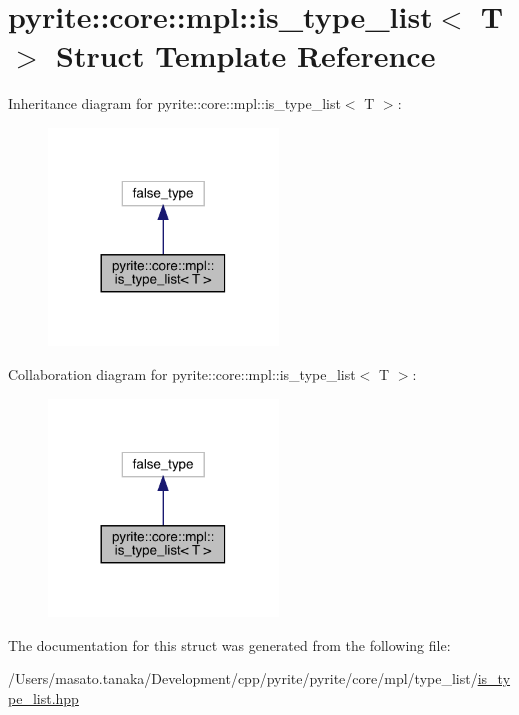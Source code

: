 \hypertarget{structpyrite_1_1core_1_1mpl_1_1is__type__list}{}\section{pyrite\+:\+:core\+:\+:mpl\+:\+:is\+\_\+type\+\_\+list$<$ T $>$ Struct Template Reference}
\label{structpyrite_1_1core_1_1mpl_1_1is__type__list}


Inheritance diagram for pyrite\+:\+:core\+:\+:mpl\+:\+:is\+\_\+type\+\_\+list$<$ T $>$\+:
\nopagebreak
\begin{figure}[H]
\begin{center}
\leavevmode
\includegraphics[width=173pt]{dd/dbf/structpyrite_1_1core_1_1mpl_1_1is__type__list__inherit__graph}
\end{center}
\end{figure}


Collaboration diagram for pyrite\+:\+:core\+:\+:mpl\+:\+:is\+\_\+type\+\_\+list$<$ T $>$\+:
\nopagebreak
\begin{figure}[H]
\begin{center}
\leavevmode
\includegraphics[width=173pt]{de/d37/structpyrite_1_1core_1_1mpl_1_1is__type__list__coll__graph}
\end{center}
\end{figure}


The documentation for this struct was generated from the following file\+:\begin{DoxyCompactItemize}
\item 
/\+Users/masato.\+tanaka/\+Development/cpp/pyrite/pyrite/core/mpl/type\+\_\+list/\mbox{\hyperlink{core_2mpl_2type__list_2is__type__list_8hpp}{is\+\_\+type\+\_\+list.\+hpp}}\end{DoxyCompactItemize}
